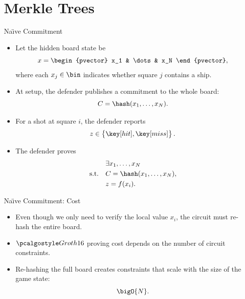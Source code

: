 \section{Merkle Trees}

\begin{frame}{Na{\"\i}ve Commitment}
    \footnotesize
    \begin{itemize}
        \item Let the hidden board state be
        \begin{equation*}
            x = \begin{pvector}
                x_1 & \dots & x_N
            \end{pvector},
        \end{equation*}
        where each $x_j \in \bin$ indicates whether square $j$ contains a ship.
    
        \item At setup, the defender publishes a commitment to the whole board:
        \begin{equation*}
            C = \hash\del{x_1, \dots, x_N}.
        \end{equation*}
    
        \item For a shot at square $i$, the defender reports
        \begin{equation*}
            z \in \set{\hit, \miss}.
        \end{equation*}
    
        \item The defender proves
        \begin{align*}
            &\exists x_1, \dots, x_N \\
            \text{s.t.} \quad
            & C = \hash\del{x_1, \dots, x_N}, \\
            & z = f\del{x_i}.
        \end{align*}
    \end{itemize}
\end{frame}

\begin{frame}{Na{\"\i}ve Commitment: Cost}
    \begin{itemize}
        \item {} Even though we only need to verify the local value $x_i$, the circuit must re-hash the entire board.
    
        \item $\groth$ proving cost depends on the number of circuit constraints.
    
        \item Re-hashing the full board creates constraints that scale with the size of the game state:
        \begin{equation*}
            \bigO{N}.
        \end{equation*}
    \end{itemize}
\end{frame}

